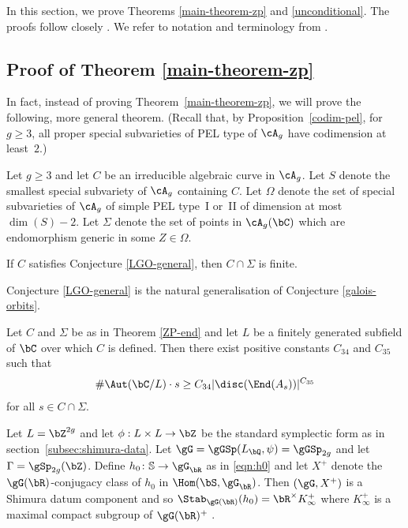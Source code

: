 In this section, we prove Theorems \ref{main-theorem-zp} and \ref{unconditional}. The proofs follow closely \hbox{\cite[\S6]{QRTUI}}. We refer to notation and terminology from \cite[\S2.2 and 2.4]{Orr18}.

\subsection{Proof of Theorem \ref{main-theorem-zp}}

In fact, instead of proving Theorem~\ref{main-theorem-zp}, we will prove the following, more general theorem. (Recall that, by Proposition~\ref{codim-pel}, for $g\geq 3$, all proper special subvarieties of PEL type of $\cA_g$ have codimension at least~$2$.)

\begin{theorem}\label{ZP-end}
Let $g\geq 3$ and let $C$ be an irreducible algebraic curve in $\cA_g$. Let $S$ denote the smallest special subvariety of $\cA_g$ containing $C$.
Let $\Omega$ denote the set of special subvarieties of $\cA_g$ of simple PEL type~I or~II of dimension at most $\dim(S)-2$. Let $\Sigma$ denote the set of points in $\cA_g(\bC)$ which are endomorphism generic in some $Z\in\Omega$.

If $C$ satisfies Conjecture \ref{LGO-general}, then $C\cap\Sigma$ is finite.
\end{theorem}

Conjecture \ref{LGO-general} is the natural generalisation of Conjecture \ref{galois-orbits}.

\begin{conjecture}\label{LGO-general}
Let $C$ and $\Sigma$ be as in Theorem \ref{ZP-end} and let $L$ be a finitely generated subfield of $\bC$ over which $C$ is defined.
Then there exist positive constants $C_{34}$ and $C_{35}$ such that
\begin{align*}
\#\Aut(\bC/L)\cdot s\geq C_{34}|\disc(\End(A_s))|^{C_{35}}
\end{align*}
for all $s\in C\cap\Sigma$.
\end{conjecture}

Let $L=\bZ^{2g}$ and let $\phi:L\times L\to\bZ$ be the standard symplectic form as in section~\ref{subsec:shimura-data}.
Let $\gG=\gGSp(L_\bQ, \psi)=\gGSp_{2g}$ and let $\Gamma=\gSp_{2g}(\bZ)$.
Define $h_0 \colon \mathbb{S}\to\gG_\bR$ as in \eqref{eqn:h0} and let $X^+$ denote the $\gG(\bR)$-conjugacy class of $h_0$ in $\Hom(\bS, \gG_\bR)$.
Then $(\gG, X^+)$ is a Shimura datum component and so $\Stab_{\gG(\bR)}(h_0) = \bR^\times K^+_\infty$ where $K^+_\infty$ is a maximal compact subgroup of $\gG(\bR)^+$ \cite[Chap.\,6]{Mil05}.

